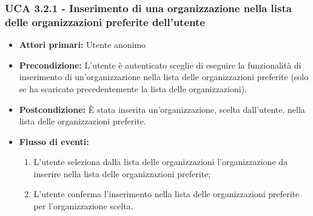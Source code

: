 \subsubsection{UCA 3.2.1 - Inserimento di una organizzazione nella lista delle organizzazioni preferite dell'utente}%
\begin{itemize}
	\item \textbf{Attori primari:} Utente anonimo
	\item \textbf{Precondizione:} L'utente è autenticato sceglie di eseguire la funzionalità di inserimento di un'organizzazione nella lista delle organizzazioni preferite (solo se ha scaricato precedentemente la lista delle organizzazioni).
	\item \textbf{Postcondizione:} È stata inserita un'organizzazione, scelta dall'utente, nella lista delle organizzazioni preferite.
	\item \textbf{Flusso di eventi:}
	\begin{enumerate}
		\item L'utente seleziona dalla lista delle organizzazioni l'organizzazione da inserire nella lista delle organizzazioni preferite;
		\item L'utente conferma l'inserimento nella lista delle organizzazioni preferite per l'organizzazione scelta.
	\end{enumerate}
\end{itemize}

